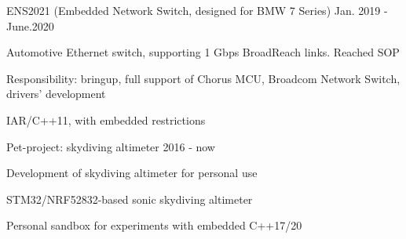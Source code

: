 \begin{cventries}
\cventry
{} %
{ENS2021 (Embedded Network Switch, designed for BMW 7 Series)} %
{} %
{Jan. 2019 - June.2020} %
{ %
\begin{cvitems}
\item {Automotive Ethernet switch, supporting 1 Gbps BroadReach links. Reached SOP}
\item {Responsibility: bringup, full support of Chorus MCU, Broadcom Network Switch, drivers' development}
\item {IAR/C++11, with embedded restrictions}
\end{cvitems}
}
\newline
\newline


\cventry
{} %
{Pet-project: skydiving altimeter} %
{} %
{2016 - now} %
{ %
\begin{cvitems}
\item {Development of skydiving altimeter for personal use}
\item {STM32/NRF52832-based sonic skydiving altimeter}
\item {Personal sandbox for experiments with embedded C++17/20}
\end{cvitems}
}
\newline
\newline

\end{cventries}